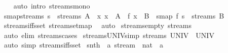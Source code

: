 \begin{isabellebody}
%
\isadelimproof
\ \ %
\endisadelimproof
%
\isatagproof
{}\isamarkupfalse%
\ {\isacharparenleft}auto\ intro{\isacharcolon}\ streams{\isacharunderscore}mono{\isacharparenright}%
\endisatagproof
{\isafoldproof}%
%
\isadelimproof
\isanewline
%
\endisadelimproof
\isanewline
{}\isamarkupfalse%
\ smap{\isacharunderscore}streams{\isacharcolon}\ {\isachardoublequoteopen}s\ {\isasymin}\ streams\ A\ {\isasymLongrightarrow}\ {\isacharparenleft}{\isasymAnd}x{\isachardot}\ x\ {\isasymin}\ A\ {\isasymLongrightarrow}\ f\ x\ {\isasymin}\ B{\isacharparenright}\ {\isasymLongrightarrow}\ smap\ f\ s\ {\isasymin}\ streams\ B{\isachardoublequoteclose}\isanewline
%
\isadelimproof
\ \ %
\endisadelimproof
%
\isatagproof
{}\isamarkupfalse%
\ streams{\isacharunderscore}iff{\isacharunderscore}sset\ stream{\isachardot}set{\isacharunderscore}map\ \isamarkupfalse%
\ auto%
\endisatagproof
{\isafoldproof}%
%
\isadelimproof
\isanewline
%
\endisadelimproof
\isanewline
{}\isamarkupfalse%
\ streams{\isacharunderscore}empty{\isacharcolon}\ {\isachardoublequoteopen}streams\ {\isacharbraceleft}{\isacharbraceright}\ {\isacharequal}\ {\isacharbraceleft}{\isacharbraceright}{\isachardoublequoteclose}\isanewline
%
\isadelimproof
\ \ %
\endisadelimproof
%
\isatagproof
{}\isamarkupfalse%
\ {\isacharparenleft}auto\ elim{\isacharcolon}\ streams{\isachardot}cases{\isacharparenright}%
\endisatagproof
{\isafoldproof}%
%
\isadelimproof
\isanewline
%
\endisadelimproof
\isanewline
{}\isamarkupfalse%
\ streams{\isacharunderscore}UNIV{\isacharbrackleft}simp{\isacharbrackright}{\isacharcolon}\ {\isachardoublequoteopen}streams\ UNIV\ {\isacharequal}\ UNIV{\isachardoublequoteclose}\isanewline
%
\isadelimproof
\ \ %
\endisadelimproof
%
\isatagproof
{}\isamarkupfalse%
\ {\isacharparenleft}auto\ simp{\isacharcolon}\ streams{\isacharunderscore}iff{\isacharunderscore}sset{\isacharparenright}%
\endisatagproof
{\isafoldproof}%
%
\isadelimproof
%
\endisadelimproof
%
\isadelimdocument
%
\endisadelimdocument
%
\isatagdocument
%
\isamarkuptrue%
%
\endisatagdocument
{\isafolddocument}%
%
\isadelimdocument
%
\endisadelimdocument
{}\isamarkupfalse%
\ snth\ {\isacharcolon}{\isacharcolon}\ {\isachardoublequoteopen}{\isacharprime}a\ stream\ {\isasymRightarrow}\ nat\ {\isasymRightarrow}\ {\isacharprime}a{\isachardoublequoteclose}\ {\isacharparenleft}\ {\isachardoublequoteopen}{\isacharbang}{\isacharbang}{\isachardoublequoteclose}\ {}{}{}{\isacharparenright}\ \isanewline

\end{isabellebody}
